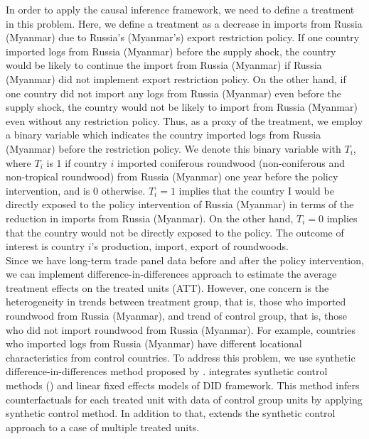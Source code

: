 \documentclass[a4paper,12pt]{article}
\begin{document}
In order to apply the causal inference framework, we need to define a treatment in this problem. Here, we define a treatment as a decrease in imports from Russia (Myanmar) due to Russia's (Myanmar's) export restriction policy. If one country imported logs from Russia (Myanmar) before the supply shock, the country would be likely to continue the import from Russia (Myanmar) if Russia (Myanmar) did not implement export restriction policy. On the other hand, if one country did not import any logs from Russia (Myanmar) even before the supply shock, the country would not be likely to import from Russia (Myanmar) even without any restriction policy. Thus, as a proxy of the treatment, we employ a binary variable which indicates the country imported logs from Russia (Myanmar) before the restriction policy. We denote this binary variable with $T_i$, where $T_i$ is 1 if country $i$ imported coniferous roundwood (non-coniferous and non-tropical roundwood) from Russia (Myanmar) one year before the policy intervention, and is 0 otherwise. $T_i = 1$ implies that the country I would be directly exposed to the policy intervention of Russia (Myanmar) in terms of the reduction in imports from Russia (Myanmar). On the other hand, $T_i = 0$ implies that the country would not be directly exposed to the policy. The outcome of interest is country $i$'s production, import, export of roundwoods.\\

Since we have long-term trade panel data before and after the policy intervention, we can implement difference-in-differences approach to estimate the average treatment effects on the treated units (ATT). However, one concern is the heterogeneity in trends between treatment group, that is, those who imported roundwood from Russia (Myanmar), and trend of control group, that is, those who did not import roundwood from Russia (Myanmar). For example, countries who imported logs from Russia (Myanmar) have different locational characteristics from control countries. To address this problem, we use synthetic difference-in-differences method proposed by \cite{xu2017generalized}. \cite{xu2017generalized} integrates synthetic control methods (\cite{abadie2010synthetic}) and linear fixed effects models of DID framework. This method infers counterfactuals for each treated unit with data of control group units by applying synthetic control method. In addition to that, \cite{xu2017generalized} extends the synthetic control approach to a case of multiple treated units.\\ 
\end{document}
